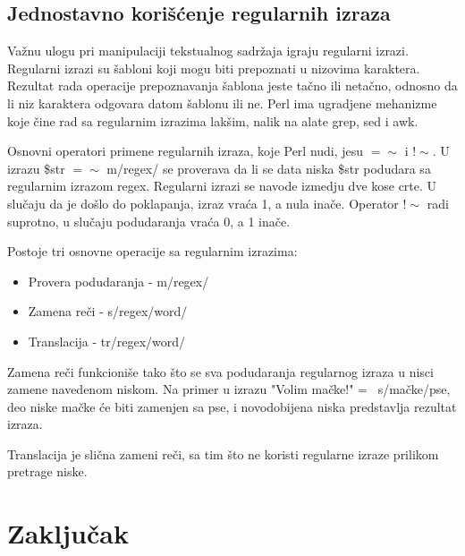 \documentclass[a4paper]{article}
\begin{document}
\subsection{Jednostavno korišćenje regularnih izraza}

Važnu ulogu pri manipulaciji tekstualnog sadržaja igraju regularni izrazi. Regularni izrazi su šabloni koji mogu biti prepoznati u nizovima karaktera. Rezultat rada operacije prepoznavanja šablona jeste tačno ili netačno, odnosno da li niz karaktera odgovara datom šablonu ili ne. Perl ima ugradjene mehanizme koje čine rad sa regularnim izrazima lakšim, nalik na alate grep, sed i awk.\cite{sed} %



Osnovni operatori primene regularnih izraza, koje Perl nudi, jesu $=\sim$ i $!\sim$. U izrazu \$str $=\sim$ m/regex/ se proverava da li se data niska \$str podudara sa regularnim izrazom regex. Regularni izrazi se navode izmedju dve kose crte. U slučaju da je došlo do poklapanja, izraz vraća 1, a nula inače. Operator $!\sim$ radi suprotno, u slučaju podudaranja vraća 0, a 1 inače.

Postoje tri osnovne operacije sa regularnim izrazima:

\begin{itemize}
  \item Provera podudaranja - m/regex/
  \item Zamena re\v ci - s/regex/word/
  \item Translacija - tr/regex/word/
\end{itemize}

Zamena reči funkcioniše tako što se sva podudaranja regularnog izraza u nisci zamene navedenom niskom. Na primer u izrazu "Volim mačke!" =~ s/mačke/pse, deo niske mačke \' ce biti zamenjen sa pse, i novodobijena niska predstavlja rezultat izraza.

Translacija je slična zameni reči, sa tim što ne koristi regularne izraze prilikom pretrage niske.


\section{Zaključak}
\label{sec:zakljucak}
\end{document}
